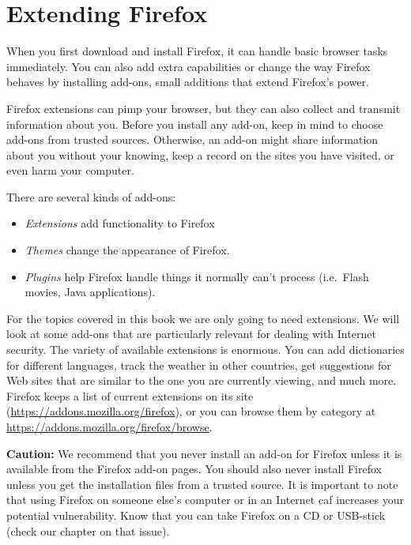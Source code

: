 \section{Extending Firefox}

When you first download and install Firefox, it can handle basic browser
tasks immediately. You can also add extra capabilities or change the way
Firefox behaves by installing add-ons, small additions that extend
Firefox's power.

Firefox extensions can pimp your browser, but they can also collect and
transmit information about you. Before you install any add-on, keep in
mind to choose add-ons from trusted sources. Otherwise, an add-on might
share information about you without your knowing, keep a record on the
sites you have visited, or even harm your computer.

There are several kinds of add-ons:

\begin{itemize}
\item
  \emph{Extensions} add functionality to Firefox
\item
  \emph{Themes} change the appearance of Firefox.
\item
  \emph{Plugins} help Firefox handle things it normally can't process
  (i.e.~Flash movies, Java applications).
\end{itemize}
For the topics covered in this book we are only going to need
extensions. We will look at some add-ons that are particularly relevant
for dealing with Internet security. The variety of available extensions
is enormous. You can add dictionaries for different languages, track the
weather in other countries, get suggestions for Web sites that are
similar to the one you are currently viewing, and much more. Firefox
keeps a list of current extensions on its site
(\href{https://addons.mozilla.org/firefox}{https://addons.mozilla.org/firefox}),
or you can browse them by category at
\href{https://addons.mozilla.org/firefox/browse}{https://addons.mozilla.org/firefox/browse}.

\textbf{Caution:} We recommend that you never install an add-on for
Firefox unless it is available from the Firefox add-on pages. You should
also never install Firefox unless you get the installation files from a
trusted source. It is important to note that using Firefox on someone
else's computer or in an Internet caf increases your potential
vulnerability. Know that you can take Firefox on a CD or USB-stick
(check our chapter on that issue).

